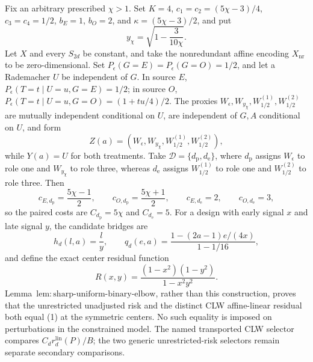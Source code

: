 Fix an arbitrary prescribed \(\chi>1\). Set \(K=4\), \(c_1=c_2=(5\chi-3)/4\), \(c_3=c_4=1/2\), \(b_E=1\), \(b_O=2\), and \(\kappa=(5\chi-3)/2\), and put
\[
 y_{\chi}=\sqrt{1-\frac{3}{10\chi}}.
\]
Let \(X\) and every \(S_{2d}\) be constant, and take the nonredundant affine encoding \(X_{\mathrm{nr}}\) to be zero-dimensional. Set \(P_{\epsilon}(G=E)=P_{\epsilon}(G=O)=1/2\), and let a Rademacher \(U\) be independent of \(G\). In source \(E\), \(P_{\epsilon}(T=t\mid U=u,G=E)=1/2\); in source \(O\), \(P_{\epsilon}(T=t\mid U=u,G=O)=(1+tu/4)/2\). The proxies \(W_{\epsilon},W_{y_{\chi}},W_{1/2}^{(1)},W_{1/2}^{(2)}\) are mutually independent conditional on \(U\), are independent of \(G,A\) conditional on \(U\), and form
\[
 Z(a)=(W_{\epsilon},W_{y_{\chi}},W_{1/2}^{(1)},W_{1/2}^{(2)}),
\]
while \(Y(a)=U\) for both treatments. Take \(\mathcal D=\{d_{\mathrm p},d_{\mathrm e}\}\), where \(d_{\mathrm p}\) assigns \(W_{\epsilon}\) to role one and \(W_{y_{\chi}}\) to role three, whereas \(d_{\mathrm e}\) assigns \(W_{1/2}^{(1)}\) to role one and \(W_{1/2}^{(2)}\) to role three. Then
\[
 c_{E,d_{\mathrm p}}=\frac{5\chi-1}{2},\qquad
 c_{O,d_{\mathrm p}}=\frac{5\chi+1}{2},\qquad
 c_{E,d_{\mathrm e}}=2,\qquad c_{O,d_{\mathrm e}}=3,
\]
so the paired costs are \(C_{d_{\mathrm p}}=5\chi\) and \(C_{d_{\mathrm e}}=5\). For a design with early signal \(x\) and late signal \(y\), the candidate bridges are
\[
 h_d(l,a)=\frac{l}{y},
 \qquad
 q_d(e,a)=\frac{1-(2a-1)e/(4x)}{1-1/16},
\]
and define the exact center residual function
\[
 R(x,y)=\frac{(1-x^2)(1-y^2)}{1-x^2y^2}.                  \tag{1}
\]
Lemma~\(\mathrm{lem{:}sharp\text{-}uniform\text{-}binary\text{-}elbow}\), rather than this construction, proves that the unrestricted unadjusted risk and the distinct CLW affine-linear residual both equal (1) at the symmetric centers. No such equality is imposed on perturbations in the constrained model. The named transported CLW selector compares \(C_dr_d^{\mathrm{lin}}(P)/B\); the two generic unrestricted-risk selectors remain separate secondary comparisons.

